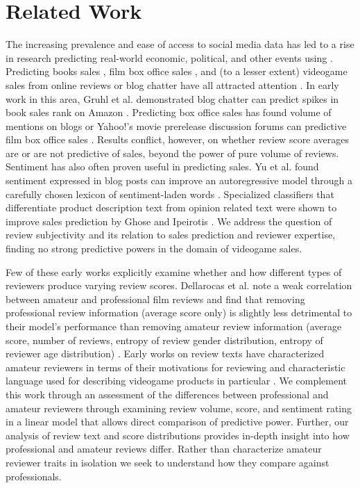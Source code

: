 \documentclass[letterpaper]{article}
\begin{document}
\section{Related Work}
The increasing prevalence and ease of access to social media data has led to a rise in research predicting real-world economic, political, and other events using \cite{asur2010predicting}. Predicting books sales \cite{gruhl2005predictive}, film box office sales \cite{dellarocas2007exploring,yu2012mining}, and (to a lesser extent) videogame sales from online reviews or blog chatter have all attracted attention \cite{ehrenfeld2011predicting,marcoux2009hybrid}. In early work in this area, Gruhl et al. demonstrated blog chatter can predict spikes in book sales rank on Amazon \cite{gruhl2005predictive}. 
Predicting box office sales has found volume of mentions on blogs or Yahoo!'s movie prerelease discussion forums can predictive film box office sales \cite{liu2001word,duan2008online}. Results conflict, however, on whether review score averages are \cite{dellarocas2007exploring} or are not \cite{liu2001word}\cite{duan2008online} predictive of sales, beyond the power of pure volume of reviews.
Sentiment has also often proven useful in predicting sales. Yu et al. found sentiment expressed in blog posts can improve an autoregressive model through a carefully chosen lexicon of sentiment-laden words \cite{yu2012mining}. Specialized classifiers that differentiate product description text from opinion related text were shown to improve sales prediction by Ghose and Ipeirotis \cite{ghose2007designing}. 
We address the question of review subjectivity and its relation to sales prediction and reviewer expertise, finding no strong predictive powers in the domain of videogame sales.

Few of these early works explicitly examine whether and how different types of reviewers produce varying review scores. Dellarocas et al. note a weak correlation between amateur and professional film reviews and find that removing professional review information (average score only) is slightly less detrimental to their model's performance than removing amateur review information (average score, number of reviews, entropy of review gender distribution, entropy of reviewer age distribution) \cite{dellarocas2007exploring}. Early works on review texts have characterized amateur reviewers in terms of their motivations for reviewing \cite{gilbert2010deja} and characteristic language used for describing videogame products in particular \cite{zagal2011natural}. We complement this work through an assessment of the differences between professional and amateur reviewers through examining review volume, score, and sentiment rating in a linear model that allows direct comparison of predictive power. Further, our analysis of review text and score distributions provides in-depth insight into how professional and amateur reviews differ. Rather than characterize amateur reviewer traits in isolation we seek to understand how they compare against professionals.
\end{document}
